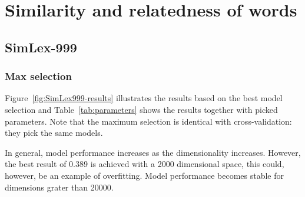 



\chapter{Similarity and relatedness of words}
\label{sec:lexical}

\section{SimLex-999}
\label{sec:simlex-999}

\subsection{Max selection}
\label{sec:max-selection-simlex}



Figure~\ref{fig:SimLex999-results} illustrates the results based on the best model selection and Table~\ref{tab:parameters} shows the results together with picked parameters. Note that the maximum selection is identical with cross-validation: they pick the same models.

In general, model performance increases as the dimensionality increases. However, the best result of 0.389 is achieved with a 2000 dimensional space, this could, however, be an example of overfitting. Model performance becomes stable for dimensions grater than 20000.

